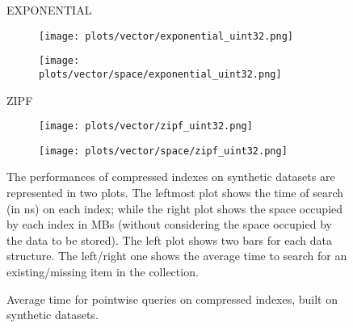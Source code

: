 \documentclass{article}
\begin{document}
\begin{figure}[!htbp]
{\begin{minipage}[t][0.98\textheight][t]{\textwidth}
    \begin{minipage}{0.03\linewidth}
    \begin{sideways}\small EXPONENTIAL\end{sideways}
    \end{minipage}
    \begin{minipage}{0.3\linewidth}
        \begin{figure}[H]
        \texttt{[image: plots/vector/exponential\_uint32.png]}
        \end{figure}
    \end{minipage}
    \begin{minipage}{0.3\linewidth}
        \begin{figure}[H]
            \texttt{[image: plots/vector/space/exponential\_uint32.png]}
        \end{figure}
    \end{minipage}
    \vspace*{-20px}

    \begin{minipage}{0.03\linewidth}
    \begin{sideways}\small ZIPF\end{sideways}
    \end{minipage}
    \begin{minipage}{0.3\linewidth}
        \begin{figure}[H]
        \texttt{[image: plots/vector/zipf\_uint32.png]}
        \end{figure}
    \end{minipage}
    \begin{minipage}{0.3\linewidth}
        \begin{figure}[H]
            \texttt{[image: plots/vector/space/zipf\_uint32.png]}
        \end{figure}
    \end{minipage}

    \vspace*{10px}
    \centering
    \begin{minipage}{\linewidth}
The performances of compressed indexes on synthetic datasets are represented in two plots. The leftmost plot shows the time of search (in ns) on each index; while the right plot shows the space occupied by each index in MBs (without considering the space occupied by the data to be stored). The left plot shows two bars for each data structure. The left/right one shows the average time to search for an existing/missing item in the collection.
    \end{minipage}
    \vfill
\end{minipage}
}
\caption{Average time for pointwise queries on compressed indexes, built on synthetic datasets.}
\end{figure}
\end{document}

